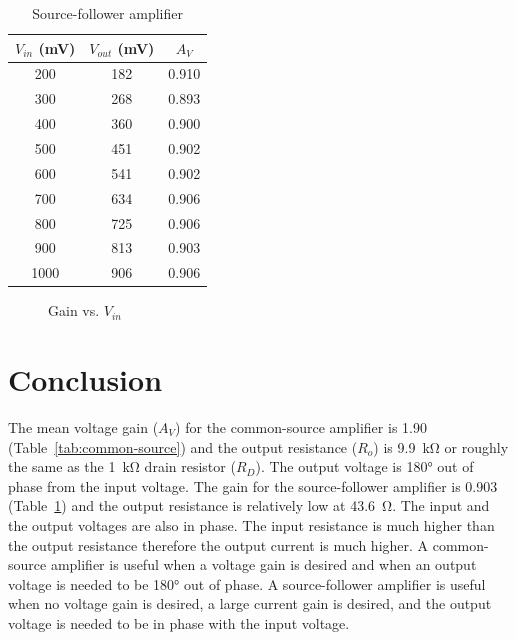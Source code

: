\begin{table}[hbtp]
  \centering
  \begin{tabular}{ccc}
    $V_{in}$ (\si{mV}) & $V_{out}$ (\si{mV}) & $A_V$ \\
    \hline
    200                & 182                 & 0.910 \\
    300                & 268                 & 0.893 \\
    400                & 360                 & 0.900 \\
    500                & 451                 & 0.902 \\
    600                & 541                 & 0.902 \\
    700                & 634                 & 0.906 \\
    800                & 725                 & 0.906 \\
    900                & 813                 & 0.903 \\
    1000               & 906                 & 0.906 \\
  \end{tabular}
  \caption{\label{tab:source-follower} Source-follower amplifier}
\end{table}

\begin{figure}[hbtp]
  \centering
  \resizebox{1.0\textwidth}{!}{}
  \caption{\label{fig:graph} Gain vs. $V_{in}$}
\end{figure}

\newpage

\section{Conclusion}
\label{sec:conclusion}

The mean voltage gain ($A_V$) for the common-source amplifier is 1.90 (Table~\ref{tab:common-source}) and the output resistance ($R_o$) is \SI{9.9}{\kilo\ohm} or roughly the same as the \SI{1}{\kilo\ohm} drain resistor ($R_D$).  The output voltage is 180° out of phase from the input voltage.  The gain for the source-follower amplifier is 0.903 (Table~\ref{tab:source-follower}) and the output resistance is relatively low at \SI{43.6}{\ohm}.  The input and the output voltages are also in phase.   The input resistance is much higher than the output resistance therefore the output current is much higher.   A common-source amplifier is useful when a voltage gain is desired and when an output voltage is needed to be 180° out of phase.  A source-follower amplifier is useful when no voltage gain is desired, a large current gain is desired, and the output voltage is needed to be in phase with the input voltage.

